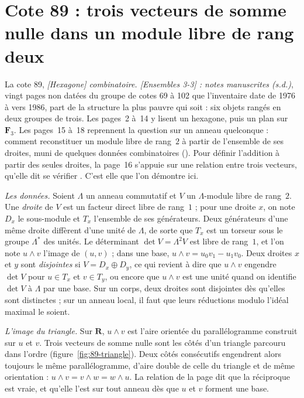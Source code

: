 \section[Cote 89 : la relation fondamentale en rang deux]{Cote 89 : trois vecteurs de somme nulle dans un module libre de rang deux\protect{}}\label{sec:89}

La cote 89, \emph{[Hexagone] combinatoire. [Ensembles 3-3] : notes manuscrites (s.d.)}, vingt pages non datées du groupe de cotes 69 à 102 que l'inventaire date de 1976 à vers 1986, part de la structure la plus pauvre qui soit : six objets rangés en deux groupes de trois. Les pages~2 à~14 y lisent un hexagone, puis un plan sur $\mathbf F_3$. Les pages~15 à~18 reprennent la question sur un anneau quelconque : comment reconstituer un module libre de rang~$2$ à partir de l'ensemble de ses droites, muni de quelques données combinatoires (). Pour définir l'addition à partir des seules droites, la page~16 s'appuie sur une relation entre trois vecteurs, qu'elle dit se vérifier . C'est elle que l'on démontre ici.

\emph{Les données.} Soient $\Lambda$ un anneau commutatif et $V$ un $\Lambda$-module libre de rang~$2$. Une \emph{droite} de $V$ est un facteur direct libre de rang~$1$ ; pour une droite $x$, on note $D_x$ le sous-module et $T_x$ l'ensemble de ses générateurs. Deux générateurs d'une même droite diffèrent d'une unité de $\Lambda$, de sorte que $T_x$ est un torseur sous le groupe $\Lambda^*$ des unités. Le déterminant $\det V = \Lambda^2 V$ est libre de rang~$1$, et l'on note $u \wedge v$ l'image de $(u, v)$ ; dans une base, $u \wedge v = u_0 v_1 - u_1 v_0$. Deux droites $x$ et $y$ sont \emph{disjointes} si $V = D_x \oplus D_y$, ce qui revient à dire que $u \wedge v$ engendre $\det V$ pour $u \in T_x$ et $v \in T_y$, ou encore que $u \wedge v$ est une unité quand on identifie $\det V$ à $\Lambda$ par une base. Sur un corps, deux droites sont disjointes dès qu'elles sont distinctes ; sur un anneau local, il faut que leurs réductions modulo l'idéal maximal le soient.

\emph{L'image du triangle.} Sur $\mathbf R$, $u \wedge v$ est l'aire orientée du parallélogramme construit sur $u$ et $v$. Trois vecteurs de somme nulle sont les côtés d'un triangle parcouru dans l'ordre (figure~\ref{fig:89-triangle}). Deux côtés consécutifs engendrent alors toujours le même parallélogramme, d'aire double de celle du triangle et de même orientation : $u \wedge v = v \wedge w = w \wedge u$. La relation de la page dit que la réciproque est vraie, et qu'elle l'est sur tout anneau dès que $u$ et $v$ forment une base.

